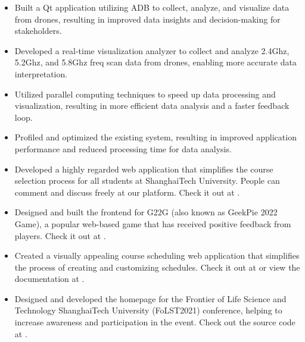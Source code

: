 \documentclass{resume}
\begin{document}

\begin{itemize}
  \item Built a Qt application utilizing ADB to collect, analyze, and visualize data from drones, resulting in improved data insights and decision-making for stakeholders.
  \item Developed a real-time visualization analyzer to collect and analyze 2.4Ghz, 5.2Ghz, and 5.8Ghz freq scan data from drones, enabling more accurate data interpretation.
  \item Utilized parallel computing techniques to speed up data processing and visualization, resulting in more efficient data analysis and a faster feedback loop.
  \item Profiled and optimized the existing system, resulting in improved application performance and reduced processing time for data analysis.
\end{itemize}


\begin{itemize}
  \item Developed a highly regarded web application that simplifies the course selection process for all students at ShanghaiTech University. People can comment and discuss freely at our platform. Check it out at .
  \item Designed and built the frontend for G22G (also known as GeekPie 2022 Game), a popular web-based game that has received positive feedback from players. Check it out at .
  \item Created a visually appealing course scheduling web application that simplifies the process of creating and customizing schedules. Check it out at  or view the documentation at .
  \item Designed and developed the homepage for the Frontier of Life Science and Technology ShanghaiTech University (FoLST2021) conference, helping to increase awareness and participation in the event. Check out the source code at .
\end{itemize}
\end{document}
